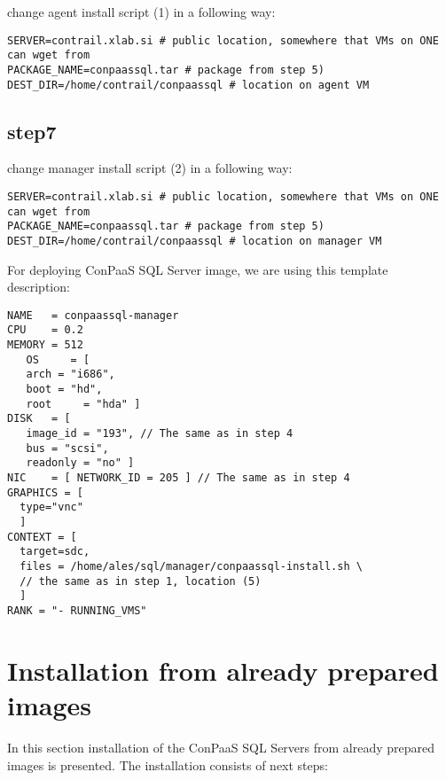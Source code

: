 \documentclass[a4paper,10pt]{article}
\begin{document}
change agent install script (1) in a following way:

\begin{Verbatim}[frame=single]
SERVER=contrail.xlab.si # public location, somewhere that VMs on ONE can wget from
PACKAGE_NAME=conpaassql.tar # package from step 5)
DEST_DIR=/home/contrail/conpaassql # location on agent VM
\end{Verbatim}

\subsection*{step7}

change manager install script (2) in a following way:

\begin{Verbatim}[frame=single]
SERVER=contrail.xlab.si # public location, somewhere that VMs on ONE can wget from
PACKAGE_NAME=conpaassql.tar # package from step 5)
DEST_DIR=/home/contrail/conpaassql # location on manager VM
\end{Verbatim}

For deploying ConPaaS SQL Server image, we are using this template description:

\begin{Verbatim}[frame=single]
NAME   = conpaassql-manager
CPU    = 0.2
MEMORY = 512
   OS     = [
   arch = "i686",
   boot = "hd",
   root     = "hda" ]
DISK   = [
   image_id = "193", // The same as in step 4
   bus = "scsi",
   readonly = "no" ]
NIC    = [ NETWORK_ID = 205 ] // The same as in step 4
GRAPHICS = [
  type="vnc"
  ]
CONTEXT = [
  target=sdc,
  files = /home/ales/sql/manager/conpaassql-install.sh \
  // the same as in step 1, location (5)
  ]
RANK = "- RUNNING_VMS"
\end{Verbatim}

\section{Installation from already prepared images}
\label{sec:install-images}

In this section installation of the ConPaaS SQL Servers from already prepared images is presented. The installation consists of next steps:
\end{document}
